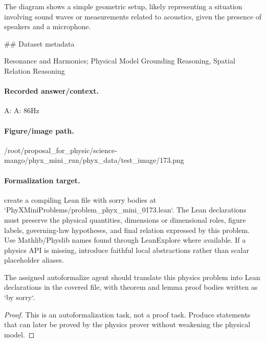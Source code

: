 The diagram shows a simple geometric setup, likely representing a situation involving sound waves or measurements related to acoustics, given the presence of speakers and a microphone.

\#\# Dataset metadata

Resonance and Harmonics; Physical Model Grounding Reasoning, Spatial Relation Reasoning

\paragraph{Recorded answer/context.}
A: A: 86Hz

\paragraph{Figure/image path.}
/root/proposal\_for\_physic/science-mango/phyx\_mini\_run/phyx\_data/test\_image/173.png

\paragraph{Formalization target.}
create a compiling Lean file with sorry bodies at `PhyXMiniProblems/problem\_phyx\_mini\_0173.lean`. The Lean declarations must preserve the physical quantities, dimensions or dimensional roles, figure labels, governing-law hypotheses, and final relation expressed by this problem.
Use Mathlib/Physlib names found through LeanExplore where available. If a physics API is missing, introduce faithful local abstractions rather than scalar placeholder aliases.

\begin{theorem}
\label{thm:physics:phyx_mini_0173:target}
The assigned autoformalize agent should translate this physics problem into Lean declarations in the covered file, with theorem and lemma proof bodies written as `by sorry`.
\end{theorem}
\begin{proof}
This is an autoformalization task, not a proof task. Produce statements that can later be proved by the physics prover without weakening the physical model.
\end{proof}

